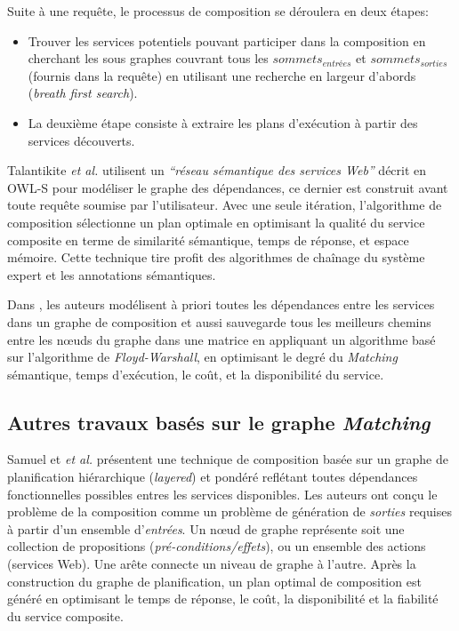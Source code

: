   Suite à une requête, le processus de composition se déroulera en
  deux étapes:

  \SpecialItem
  \begin{itemize}
  \item Trouver les services potentiels pouvant participer dans la
    composition en cherchant les sous graphes couvrant tous les
    $sommets_{entrées}$ et $sommets_{sorties}$ (fournis dans la
    requête) en utilisant une recherche en largeur d'abords
    (\textit{breath first search}).

  \item La deuxième étape consiste à extraire les plans d'exécution
    à partir des services découverts.\bigskip
  \end{itemize}

  Talantikite \textit{et al.} \cite{talantikite2009semantic} utilisent
  un \emph{``réseau sémantique des services Web''} décrit en
  \textsc{OWL-S} pour modéliser le graphe des dépendances, ce dernier
  est construit avant toute requête soumise par l'utilisateur. Avec
  une seule itération, l'algorithme de composition sélectionne un plan
  optimale en optimisant la qualité du service composite en terme de
  similarité sémantique, temps de réponse, et espace mémoire.
  Cette technique tire profit des algorithmes de chaînage du
  système expert et les annotations sémantiques.\bigskip

  Dans \cite{elmaghraoui2011graph}, les auteurs modélisent à priori
  toutes les dépendances entre les services dans un graphe de
  composition et aussi sauvegarde tous les meilleurs chemins entre les
  nœuds du graphe dans une matrice en appliquant un algorithme basé
  sur l'algorithme de \textit{Floyd-Warshall}, en optimisant le degré
  du \textit{Matching} sémantique, temps d'exécution, le coût, et la
  disponibilité du service.

  \subsection{Autres travaux basés sur le graphe \textit{Matching}}
  \label{sec:autres-travaux}
  Samuel et \textit{et al.} \cite{samuel2011approach} présentent une
  technique de composition basée sur un graphe de planification
  hiérarchique (\textit{layered}) et pondéré reflétant toutes
  dépendances fonctionnelles possibles entres les services
  disponibles. Les auteurs ont conçu le problème de la composition
  comme un problème de génération de \textit{sorties} requises à partir
  d'un ensemble d'\textit{entrées}. Un nœud de graphe représente
  soit une collection de propositions
  (\textit{pré-conditions/effets}), ou un ensemble des actions
  (services Web). Une arête connecte un niveau de graphe à l'autre.
  Après la construction du graphe de planification, un plan optimal
  de composition est généré en optimisant le temps de réponse, le
  coût, la disponibilité et la fiabilité du service composite.\bigskip

